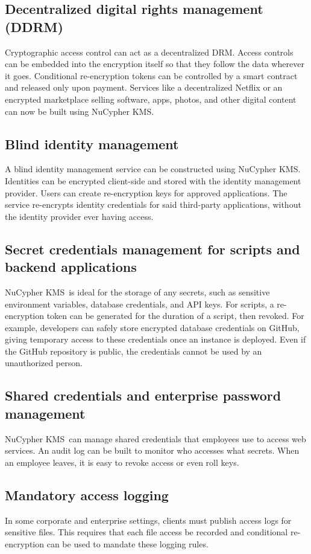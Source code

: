 \documentclass[longbibliography,nofootinbib]{revtex4-1}
\newcommand{\kms}{NuCypher KMS}
\begin{document}
\subsection{Decentralized digital rights management (DDRM)}
\label{sec:drm}
Cryptographic access control can act as a decentralized DRM.
Access controls can be embedded into the encryption itself so that they follow the data wherever it goes.
Conditional re-encryption tokens can be controlled by a smart contract and released only upon payment.
Services like a decentralized Netflix or an encrypted marketplace selling software, apps, photos, and other digital content
can now be built using \kms.

\subsection{Blind identity management}
A blind identity management service can be constructed using \kms. Identities can be encrypted client-side and stored with the
identity management provider. Users can create re-encryption keys for approved applications. The service re-encrypts identity
credentials for said third-party applications, without the identity provider ever having access.

\subsection{Secret credentials management for scripts and backend applications}
\kms~is ideal for the storage of any secrets, such as sensitive environment variables, database credentials, and API keys.
For scripts, a re-encryption token can be generated for the duration of a script, then revoked.
For example, developers can safely store encrypted database credentials on GitHub, giving temporary access to these credentials
once an instance is deployed.
Even if the GitHub repository is public, the credentials cannot be used by an unauthorized person.

\subsection{Shared credentials and enterprise password management}
\kms~can manage shared credentials that employees use to access web services.
An audit log can be built to monitor who accesses what secrets.
When an employee leaves, it is easy to revoke access or even roll keys.

\subsection{Mandatory access logging}
In some corporate and enterprise settings, clients must publish access logs for sensitive files.
This requires that each file access be recorded and conditional re-encryption can be used to mandate these logging rules.
\end{document}
